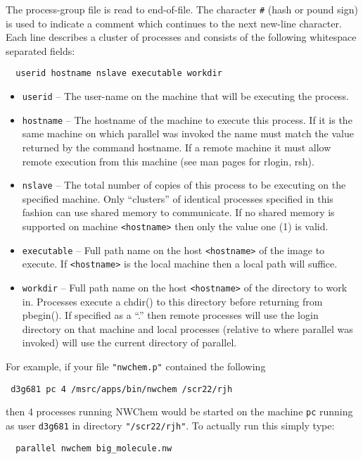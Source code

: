The process-group file is read to end-of-file.  The character \verb+#+
(hash or pound sign) is used to indicate a comment which continues to
the next new-line character.  Each line describes a cluster of
processes and consists of the following whitespace separated fields:

\begin{verbatim}
  userid hostname nslave executable workdir
\end{verbatim}

\begin{itemize}
\item \verb+userid+ -- The user-name on the machine that will be executing the
      process. 

\item \verb+hostname+ --  The hostname of the machine to execute this process.
             If it is the same machine on which parallel was invoked
             the name must match the value returned by the command 
             hostname. If a remote machine it must allow remote execution
             from this machine (see man pages for rlogin, rsh).

\item \verb+nslave+ --  The total number of copies of this process to be executing
             on the specified machine. Only ``clusters'' of identical processes
             specified in this fashion can use shared memory to communicate.
             If no shared memory is supported on machine \verb+<hostname>+ then
             only the value one (1) is valid.

\item \verb+executable+ --  Full path name on the host \verb+<hostname>+ of the image to execute.
             If \verb+<hostname>+ is the local machine then a local path will
             suffice.

\item \verb+workdir+ --  Full path name on the host \verb+<hostname>+ of the directory to
             work in. Processes execute a chdir() to this directory before
             returning from pbegin(). If specified as a ``.'' then remote
             processes will use the login directory on that machine and local
             processes (relative to where parallel was invoked) will use
             the current directory of parallel.
\end{itemize}

  For example, if your file \verb+"nwchem.p"+ contained the following
\begin{verbatim}
 d3g681 pc 4 /msrc/apps/bin/nwchem /scr22/rjh
\end{verbatim}
then 4 processes running NWChem would be started on the machine 
\verb+pc+ running as user \verb+d3g681+ in directory \verb+"/scr22/rjh"+.
To actually run this simply type:
\begin{verbatim}
  parallel nwchem big_molecule.nw
\end{verbatim}

